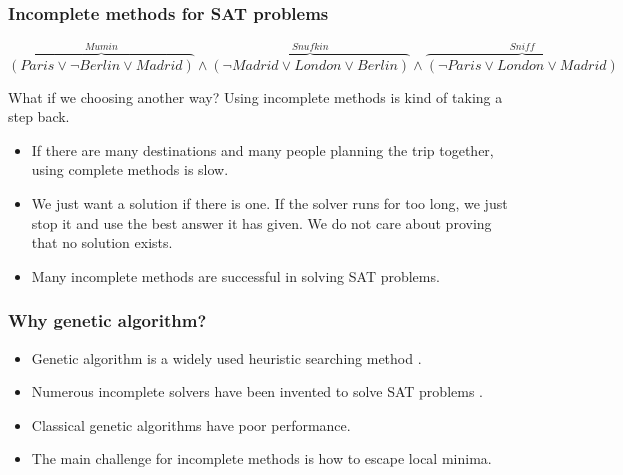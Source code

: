 \begin{frame}
\frametitle{Incomplete methods for SAT problems}
\begin{scriptsize}
	\begin{equation*}
		\overbrace{(Paris \vee \neg Berlin \vee Madrid)}^{Mumin} \wedge \overbrace{(\neg Madrid \vee London \vee Berlin)}^{Snufkin} \wedge
		\overbrace{(\neg Paris \vee London \vee Madrid)}^{Sniff}
	\end{equation*}
\end{scriptsize}

\begin{alertblock}{What if we choosing another way?}
	Using incomplete methods is kind of taking a step
	back.
	\begin{itemize}
		\normalsize
		\item If there are many destinations and many people planning the trip together,
		      using complete methods is slow.
		\item We just want a solution if there is one. If the solver runs for too long, we
		      just stop it and use the best answer it has given. We do not care about
		      proving that no solution exists.
		\item Many incomplete methods are successful in solving SAT
		      problems\parencite{biere2009handbook}.
	\end{itemize}
\end{alertblock}

\end{frame}

\begin{frame}
\frametitle{Why genetic algorithm?}
\begin{itemize}
	\item Genetic algorithm is a widely used heuristic searching method
	      \parencite{Voss}.
	\item Numerous incomplete solvers have been invented to solve SAT problems
	      \parencite{marchiori1999flipping, selman1994noise}.
	\item Classical genetic algorithms have poor performance.
	\item The main challenge for incomplete methods is how to escape local minima.
\end{itemize}

\end{frame}

